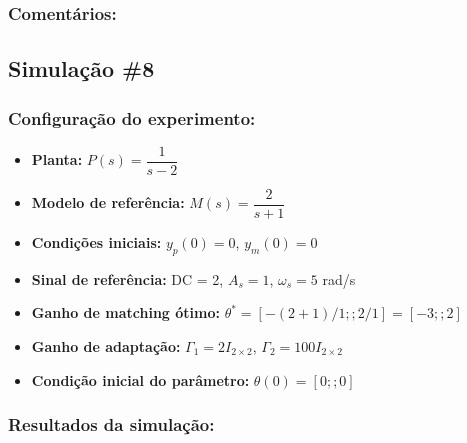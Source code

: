 \documentclass[10pt]{article}
\begin{document}
\subsubsection{Comentários:}

\subsection{Simulação \#8}
\subsubsection{Configuração do experimento:}
\begin{itemize}
\item \textbf{Planta:} $P(s) = \dfrac{1}{s - 2}$
\item \textbf{Modelo de referência:} $M(s) = \dfrac{2}{s + 1}$
\item \textbf{Condições iniciais:} $y_p(0)=0$, $y_m(0)=0$
\item \textbf{Sinal de referência:} DC = 2, $A_s=1$, $\omega_s=5$ rad/s
\item \textbf{Ganho de matching ótimo:} $\theta^* = [-(2+1)/1;;2/1] = [-3;;2]$
\item \textbf{Ganho de adaptação:} $\Gamma_1 = 2I_{2\times2}$, $\Gamma_2 = 100I_{2\times2}$
\item \textbf{Condição inicial do parâmetro:} $\theta(0) = [0;;0]$
\end{itemize}

\subsubsection{Resultados da simulação:}
\end{document}
